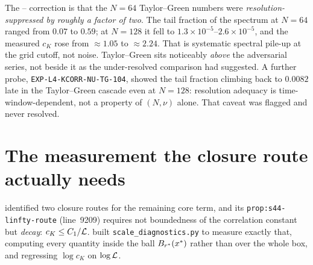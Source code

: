 The -- correction is that the \(N=64\) Taylor--Green numbers were
\emph{resolution-suppressed by roughly a factor of two}. The tail fraction of
the spectrum at \(N=64\) ranged from \(0.07\) to \(0.59\); at \(N=128\) it fell
to \(1.3\times10^{-5}\)--\(2.6\times10^{-5}\), and the measured \(c_K\) rose
from \(\approx1.05\) to \(\approx2.24\). That is systematic spectral pile-up at
the grid cutoff, not noise. Taylor--Green sits noticeably \emph{above} the
adversarial series, not beside it as the under-resolved comparison had
suggested. A further probe, \texttt{EXP-L4-KCORR-NU-TG-104}, showed the tail
fraction climbing back to \(0.0082\) late in the Taylor--Green cascade even at
\(N=128\): resolution adequacy is time-window-dependent, not a property of
\((N,\nu)\) alone. That caveat was flagged and never resolved.

\section{The measurement the closure route actually needs}
\label{sec:l-dependence}

 identified two closure routes for the remaining core term, and its
\texttt{prop:s44-linfty-route} (line~9209) requires not boundedness of the
correlation constant but \emph{decay}: \(c_K\le C_1/\mathcal{L}\).  built
\texttt{scale\_diagnostics.py} to measure exactly that, computing every
quantity inside the ball \(B_{r^{*}}(x^*)\) rather than over the whole box,
and regressing \(\log c_K\) on \(\log\mathcal{L}\).

